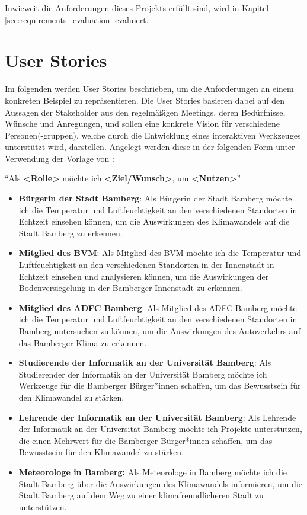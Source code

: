 Inwieweit die Anforderungen dieses Projekts erfüllt sind, wird in Kapitel \ref{sec:requirements_evaluation} evaluiert. 

\section{User Stories}
Im folgenden werden User Stories beschrieben, um die Anforderungen an einem konkreten Beispiel zu repräsentieren. Die User Stories basieren dabei auf den Aussagen der Stakeholder aus den regelmäßigen Meetings, deren Bedürfnisse, Wünsche und Anregungen, und sollen eine konkrete Vision für verschiedene Personen(-gruppen), welche durch die Entwicklung eines interaktiven Werkzeuges unterstützt wird, darstellen. Angelegt werden diese in der folgenden Form unter Verwendung der Vorlage von \cite{AmblerUserStory}:

\enquote{Als \textbf{<Rolle>} möchte ich \textbf{<Ziel/Wunsch>}, um \textbf{<Nutzen>}}

\begin{itemize}
    \item \textbf{Bürgerin der Stadt Bamberg}: Als Bürgerin der Stadt Bamberg möchte ich die Temperatur und Luftfeuchtigkeit an den verschiedenen Standorten in Echtzeit einsehen können, um die Auswirkungen des Klimawandels auf die Stadt Bamberg zu erkennen.
    \item \textbf{Mitglied des \ac{BVM}}: Als Mitglied des \ac{BVM} möchte ich die Temperatur und Luftfeuchtigkeit an den verschiedenen Standorten in der Innenstadt in Echtzeit einsehen und analysieren können, um die Auswirkungen der Bodenversiegelung in der Bamberger Innenstadt zu erkennen.
    \item \textbf{Mitglied des \ac{ADFC} Bamberg}: Als Mitglied des \ac{ADFC} Bamberg möchte ich die Temperatur und Luftfeuchtigkeit an den verschiedenen Standorten in Bamberg untersuchen zu können, um die Auswirkungen des Autoverkehrs auf das Bamberger Klima zu erkennen.
    \item \textbf{Studierende der Informatik an der Universität Bamberg}: Als Studierender der Informatik an der Universität Bamberg möchte ich Werkzeuge für die Bamberger Bürger*innen schaffen, um das Bewusstsein für den Klimawandel zu stärken.
    \item \textbf{Lehrende der Informatik an der Universität Bamberg}: Als Lehrende der Informatik an der Universität Bamberg möchte ich Projekte unterstützen, die einen Mehrwert für die Bamberger Bürger*innen schaffen, um das Bewusstsein für den Klimawandel zu stärken.
    \item \textbf{Meteorologe in Bamberg:} Als Meteorologe in Bamberg möchte ich die Stadt Bamberg über die Auswirkungen des Klimawandels informieren, um die Stadt Bamberg auf dem Weg zu einer klimafreundlicheren Stadt zu unterstützen.
\end{itemize}

